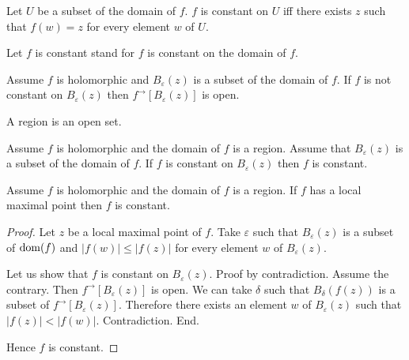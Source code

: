 \documentclass{article}
\newcommand{\Ball}[2]{B_{#1}(#2)}
\newcommand{\image}[2]{#1^{\to}[#2]}
\begin{document}
\begin{forthel}
    \begin{definition}
      Let $U$ be a subset of the domain of $f$. $f$ is constant on $U$ iff there exists $z$ such that $f(w) = z$ for every element $w$ of $U$.
    \end{definition}

    Let $f$ is constant stand for $f$ is constant on the domain of $f$.

    \begin{axiom}
      Assume $f$ is holomorphic and $\Ball{\varepsilon}{z}$ is a subset of the domain of $f$.
      If $f$ is not constant on $\Ball{\varepsilon}{z}$
        then $\image{f}{\Ball{\varepsilon}{z}}$ is open.
    \end{axiom}

    \begin{signature}
      A region is an open set.
    \end{signature}

    \begin{axiom}
      Assume $f$ is holomorphic and the domain of $f$ is a region.
      Assume that $\Ball{\varepsilon}{z}$ is a subset of the domain of $f$.
      If $f$ is constant on $\Ball{\varepsilon}{z}$ then $f$ is constant.
    \end{axiom}

    \begin{proposition}
      Assume $f$ is holomorphic and the domain of $f$ is a region.
      If $f$ has a local maximal point then $f$ is constant.
    \end{proposition}
    \begin{proof}
      Let $z$ be a local maximal point of $f$.
      Take $\varepsilon$ such that
        $\Ball{\varepsilon}{z}$ is a subset of $\operatorname{dom}(f)$
        and $|f(w)| \leq |f(z)|$ for every element $w$ of $\Ball{\varepsilon}{z}$.

      Let us show that $f$ is constant on $\Ball{\varepsilon}{z}$.
      Proof by contradiction.
        Assume the contrary.
        Then $\image{f}{\Ball{\varepsilon}{z}}$ is open.
        We can take $\delta$ such that
          $\Ball{\delta}{f(z)}$ is a subset of $\image{f}{\Ball{\varepsilon}{z}}$.
        Therefore there exists an element $w$ of $\Ball{\varepsilon}{z}$ such that
          $|f(z)| < |f(w)|$. Contradiction.
    	End.

      Hence $f$ is constant.
    \end{proof}
  \end{forthel}
\end{document}
